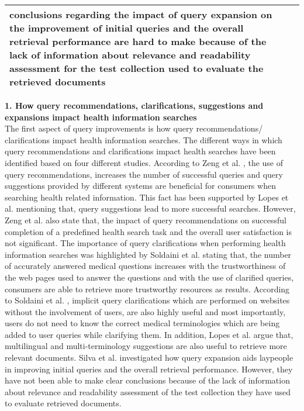 \documentclass[]{article}
\begin{document}
\begin{center}
\begin{longtable}{||p{4cm} | p{10cm}||}
conclusions regarding the impact of query expansion on the improvement of initial queries and the overall retrieval performance are hard to make because of the lack of information about relevance and readability assessment for the test collection used to evaluate the retrieved documents \\      		
		\hline
	\end{longtable}	
	
\end{center}  


\textbf{1. How query recommendations, clarifications, suggestions and expansions impact health information searches}\\


The first aspect of query improvements is how query recommendations/ clarifications impact health information searches. The different ways in which query recommendations and clarifications impact health searches have been identified based on four different studies. According to Zeng et al. \cite{zeng2006assisting}, the use of query recommendations, increases the number of successful queries and query suggestions provided by different systems are beneficial for consumers when searching health related information. This fact has been supported by Lopes et al. \cite{lopes2016health} mentioning that, query suggestions lead to more successful searches.  However, Zeng et al. \cite{zeng2006assisting} also state that, the impact of query recommendations on successful completion of a predefined health search task and the overall user satisfaction is not significant. The importance of query clarifications when performing health information searches was highlighted by Soldaini et al. \cite{soldaini2016enhancing} stating that, the number of accurately answered medical questions increases with the trustworthiness of the web pages used to answer the questions and with the use of clarified queries, consumers are able to retrieve more trustworthy resources as results. According to Soldaini et al. \cite{soldaini2016enhancing}, implicit query clarifications which are performed on websites without the involvement of users, are also highly useful and most importantly, users do not need to know the correct medical terminologies which are being added to user queries while clarifying them. In addition, Lopes et al. \cite{lopes2016health} argue that, multilingual and multi-terminology suggestions are also useful to retrieve more relevant documents. Silva et al. \cite{silva2016effectiveness} investigated how query expansion aids laypeople in improving initial queries and the overall retrieval performance. However, they have not been able to make clear conclusions because of the lack of information about relevance and readability assessment of the test collection they have used to evaluate retrieved documents. 
\end{document}
